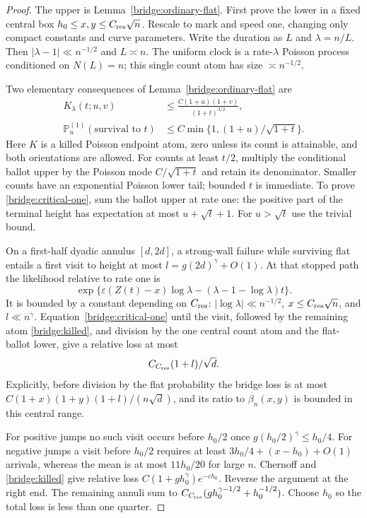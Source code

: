 \begin{proof}
The upper is Lemma~\ref{bridge:ordinary-flat}. First prove the lower
in a fixed central box $h_0\le x,y\le C_{\rm res}\sqrt n$.
Rescale to mark and speed one, changing only compact constants and
curve parameters. Write the duration as $L$ and $\lambda=n/L$.
Then $|\lambda-1|\ll n^{-1/2}$ and $L\asymp n$. The uniform
clock is a rate-$\lambda$ Poisson process conditioned on $N(L)=n$;
this single count atom has size $\asymp n^{-1/2}$.

Two elementary consequences of Lemma~\ref{bridge:ordinary-flat} are
\begin{align}
 K_\lambda(t;u,v)&\le
       \frac{C(1+u)(1+v)}{(1+t)^{3/2}},
       \label{bridge:killed}\\
 \mathbb P_u^{(1)}(\text{survival to }t)&\le
       C\min\{1,(1+u)/\sqrt{1+t}\}.
       \label{bridge:critical-one}
\end{align}
Here $K$ is a killed Poisson endpoint atom, zero unless its count is
attainable, and both orientations are allowed. For counts at least
$t/2$, multiply the conditional ballot upper by the Poisson mode
$C/\sqrt{1+t}$ and retain its denominator. Smaller counts have
an exponential Poisson lower tail; bounded $t$ is immediate. To
prove \eqref{bridge:critical-one}, sum the ballot upper at rate one:
the positive part of the terminal height has expectation at most
$u+\sqrt t+1$. For $u>\sqrt t$ use the trivial bound.

On a first-half dyadic annulus $[d,2d]$, a strong-wall failure while
surviving flat entails a first visit to height at most
$l=g(2d)^\gamma+O(1)$. At that stopped path the likelihood relative
to rate one is
\[
 \exp\{\varepsilon(Z(t)-x)\log\lambda
                 -(\lambda-1-\log\lambda)t\}.
\]
It is bounded by a constant depending on $C_{\rm res}$:
$|\log\lambda|\ll n^{-1/2}$, $x\le C_{\rm res}\sqrt n$, and
$l\ll n^\gamma$. Equation~\eqref{bridge:critical-one} until the
visit, followed by the remaining atom \eqref{bridge:killed}, and
division by the one central count atom and the flat-ballot lower,
give a relative loss at most
\begin{equation}
 C_{C_{\rm res}}(1+l)/\sqrt d.
 \label{bridge:ordinary-annulus}
\end{equation}
Explicitly, before division by the flat probability the bridge loss
is at most $C(1+x)(1+y)(1+l)/(n\sqrt d)$, and its ratio to
$\beta_n(x,y)$ is bounded in this central range.

For positive jumps no such visit occurs before $h_0/2$ once
$g(h_0/2)^\gamma\le h_0/4$. For negative jumps a visit before
$h_0/2$ requires at least $3h_0/4+(x-h_0)+O(1)$ arrivals, whereas
the mean is at most $11h_0/20$ for large $n$. Chernoff and
\eqref{bridge:killed} give relative loss
$C(1+gh_0^\gamma)e^{-ch_0}$. Reverse the argument at the right
end. The remaining annuli sum to
$C_{C_{\rm res}}(gh_0^{\gamma-1/2}+h_0^{-1/2})$.
Choose $h_0$ so the total loss is less than one quarter.


\end{proof}
